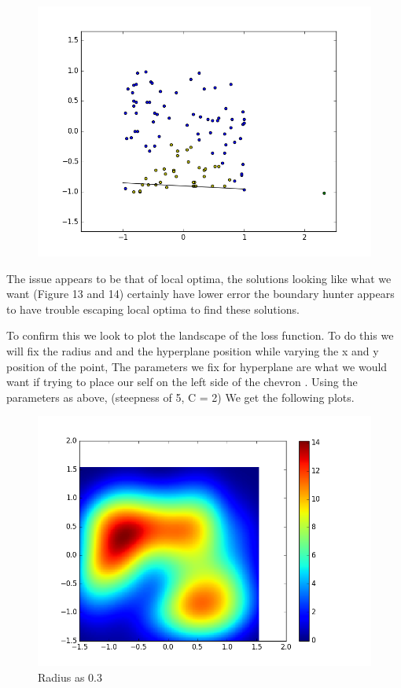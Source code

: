 \documentclass{article}
\begin{document}
\begin{figure}[H]
  \centering
  \begin{minipage}[b]{0.5\textwidth}
    \includegraphics[width=\textwidth]{BoundaryHunter-Attempt3-R2.png}
    \caption{}
  \end{minipage}
  \hfill
\end{figure}

The issue appears to be that of local optima, the solutions looking like what we want (Figure 13 and 14) certainly have lower error the boundary hunter appears to have trouble escaping local optima to find these solutions.

To confirm this we look to plot the landscape of the loss function. To do this we will fix the radius and and the hyperplane position while varying the x and y position of the point, The parameters we fix for hyperplane are what we would want if trying to place our self on the left side of the chevron . Using the parameters as above, (steepness of 5, C = 2) We get the following plots.

\begin{figure}[H]
  \centering
  \begin{minipage}[b]{0.8\textwidth}
    \includegraphics[width=\textwidth]{LossPlot-1.png}
    \caption{Radius as 0.3}
  \end{minipage}
  \hfill
\end{figure}
\end{document}
